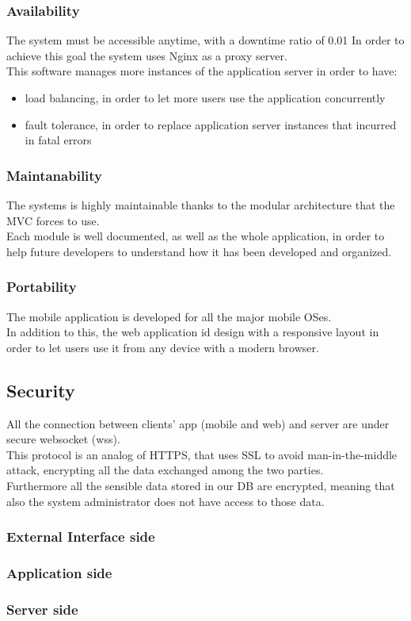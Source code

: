 \subsubsection{Availability}
The system must be accessible anytime, with a downtime ratio of 0.01 %
In order to achieve this goal the system uses Nginx as a proxy server.\\
This software manages more instances of the application server in order to have:
\begin{itemize}
\item load balancing, in order to let more users use the application concurrently
\item fault tolerance, in order to replace application server instances that incurred in fatal errors
\end{itemize}
\subsubsection{Maintanability}
The systems is highly maintainable thanks to the modular architecture that the MVC forces to use.\\
Each module is well documented, as well as the whole application, in order to help future developers to understand how it has been developed and organized.

\subsubsection{Portability}
The mobile application is developed for all the major mobile OSes.\\
In addition to this, the web application id design with a responsive layout in order to let users use it from any device with a modern browser.

\subsection{Security}
All the connection between clients’ app (mobile and web) and server are under secure websocket (wss).\\
This protocol is an analog of HTTPS, that uses SSL to avoid man-in-the-middle attack, encrypting all the data exchanged among the two parties.\\
Furthermore all the sensible data stored in our DB are encrypted, meaning that also the system administrator does not have access to those data.

\subsubsection{External Interface side}

\subsubsection{Application side}

\subsubsection{Server side}